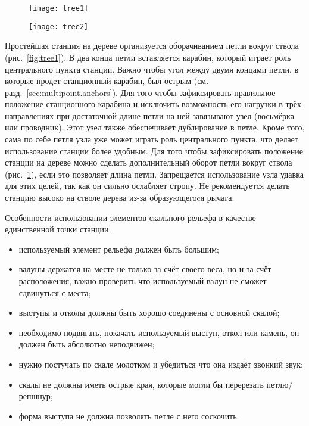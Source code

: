 \documentclass[fleqn, 12pt]{extarticle}
\begin{document}
    \begin{figure}
        \centering
        \begin{minipage}[t]{0.45\textwidth}
            \texttt{[image: tree1]}
            \label{fig:tree1}
        \end{minipage}\hspace{0.05\textwidth}
        \begin{minipage}[t]{0.45\textwidth}
            \texttt{[image: tree2]}
            \label{fig:tree2}
        \end{minipage}
    \end{figure}

	Простейшая станция на дереве организуется оборачиванием петли вокруг ствола (рис.~\ref{fig:tree1}). В два конца петли вставляется карабин, который играет роль центрального пункта станции.
    Важно чтобы угол между двумя концами петли, в которые продет станционный карабин, был острым
    (см. разд.~\ref{sec:multipoint.anchors}). Для того чтобы зафиксировать правильное положение станционного карабина и исключить возможность его нагрузки в трёх направлениях 
    при достаточной длине петли на ней завязывают узел (восьмёрка или проводник). Этот узел также обеспечивает дублирование в петле. Кроме того, сама по себе  петля узла уже может играть 
	роль центрального пункта, что делает использование станции более удобным. Для того чтобы зафиксировать положение станции на дереве можно сделать дополнительный оборот петли
    вокруг ствола (рис.~\ref{fig:tree2}),
	если это позволяет длина петли. Запрещается использование узла удавка для этих целей, так как он сильно ослабляет стропу.
    Не рекомендуется делать станцию высоко на стволе дерева из-за образующегоcя рычага.

    Особенности использовании элементов скального рельефа в качестве единственной точки станции:
    \begin{itemize}
        \item используемый элемент рельефа должен быть большим;
        \item валуны держатся на месте не только за счёт своего веса, но и за счёт расположения, важно проверить что используемый валун не сможет сдвинуться с места;
        \item выступы и отколы должны быть хорошо соединены с основной скалой;
        \item необходимо подвигать, покачать используемый выступ, откол или камень, он должен быть абсолютно неподвижен;
        \item нужно постучать по скале молотком и убедиться что она издаёт звонкий звук;
        \item скалы не должны иметь острые края, которые могли бы перерезать петлю/репшнур;
        \item форма выступа не должна позволять петле с него соскочить.
    \end{itemize}
    
\end{document}
